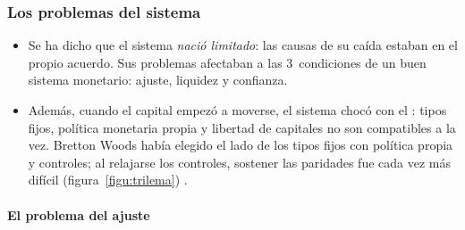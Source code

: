 \documentclass[11pt]{article}
\begin{document}
\subsubsection{Los problemas del sistema}

\begin{itemize}
\item Se ha dicho que el sistema \emph{nació limitado}: las causas de su caída estaban en el propio acuerdo. Sus problemas afectaban a las 3~condiciones de un buen sistema monetario: ajuste, liquidez y confianza.
\item Además, cuando el capital empezó a moverse, el sistema chocó con el : tipos fijos, política monetaria propia y libertad de capitales no son compatibles a la vez. Bretton Woods había elegido el lado de los tipos fijos con política propia y controles; al relajarse los controles, sostener las paridades fue cada vez más difícil (figura~\ref{figu:trilema})\nocite{ObstfeldShambaughTaylor2005} .
\end{itemize}

\begin{infografia}[H]
\centering
\caption{El trilema de la economía abierta}\label{figu:trilema}
\end{infografia}

\paragraph{El problema del ajuste}
\end{document}
